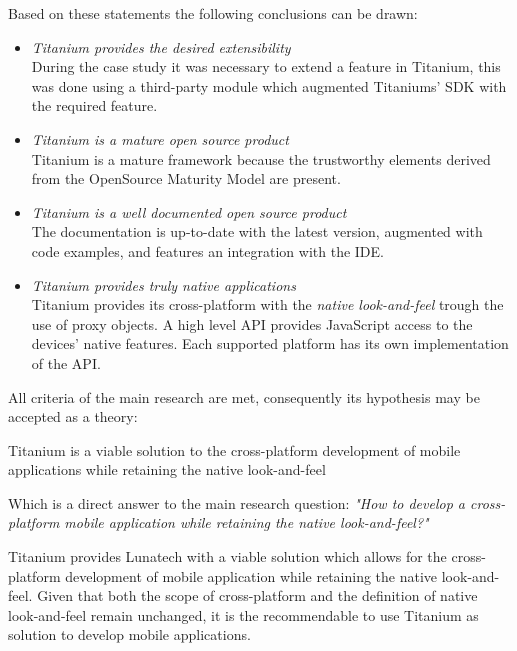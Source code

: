 Based on these statements the following conclusions can be drawn:
\begin{itemize}
\item \emph{Titanium provides the desired extensibility}\\
During the case study it was necessary to extend a feature in Titanium, this was done using a third-party module which augmented Titaniums' SDK with the required feature.

\item \emph{Titanium is a mature open source product}\\
Titanium is a mature framework because the trustworthy elements derived from the OpenSource Maturity Model are present.

\item \emph{Titanium is a well documented open source product}\\
The documentation is up-to-date with the latest version, augmented with code examples, and features an integration with the IDE.

\item \emph{Titanium provides truly native applications}\\
Titanium provides its cross-platform with the \emph{native look-and-feel} trough the use of proxy objects.  A high level API provides JavaScript access to the devices' native features. Each supported platform has its own implementation of the API.
\end{itemize}

\noindent All criteria of the main research are met, consequently its hypothesis may be accepted as a theory:

\begin{shadequote}
Titanium is a viable solution to the cross-platform development of mobile applications while retaining the native look-and-feel%
\end{shadequote}

\noindent Which is a direct answer to the main research question: \emph{"How to develop a cross-platform mobile application while retaining the native look-and-feel?"}

%
%
Titanium provides Lunatech with a viable solution which allows for the cross-platform development of mobile application while retaining the native look-and-feel. Given that both the scope of cross-platform and the definition of native look-and-feel remain unchanged, it is the recommendable to use Titanium as solution to develop mobile applications.

